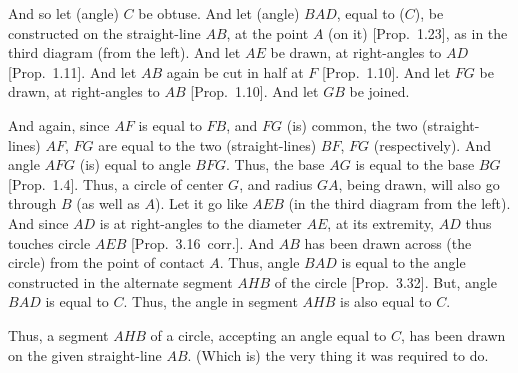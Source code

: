 \begin{Parallel}{}{}
{And so let (angle) $C$ be obtuse. And let (angle) $BAD$, equal
to ($C$), be constructed  on the straight-line $AB$, at the point $A$ 
(on it) [Prop.~1.23], as in the third diagram (from the left). And let $AE$ be
drawn, at right-angles to $AD$ [Prop.~1.11]. And let $AB$ again be 
cut in half at $F$ [Prop.~1.10]. And let $FG$ be drawn,
at right-angles to $AB$ [Prop.~1.10]. And let $GB$ 
be joined.

And again, since $AF$ is equal to $FB$, and $FG$ (is) common, the two (straight-lines) $AF$, $FG$ are equal to the two (straight-lines) $BF$, $FG$ (respectively).
And angle $AFG$ (is) equal to angle $BFG$. Thus, the base $AG$ is equal to
the base $BG$ [Prop.~1.4]. Thus, a circle of center $G$, and radius $GA$,
being drawn, will also go through $B$ (as well as $A$). Let it go like $AEB$ (in the third diagram
from the left). And since $AD$ is at right-angles to the diameter $AE$, at its extremity, $AD$ thus touches circle $AEB$ [Prop.~3.16~corr.]. And $AB$ has been drawn across (the circle) from the point of contact $A$. Thus, angle $BAD$ is equal to the angle constructed in the alternate segment $AHB$ of the circle 
[Prop.~3.32]. But, angle $BAD$ is equal to $C$. Thus, the angle in segment
$AHB$ is also equal to $C$.

Thus, a segment $AHB$ of a circle, accepting an angle equal to $C$, has been
drawn on the given straight-line $AB$. (Which is) the very thing
it was required to do.}
\end{Parallel}

